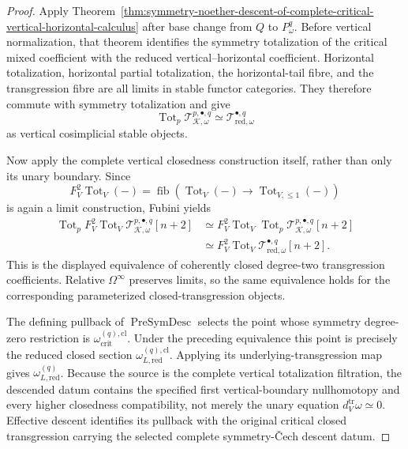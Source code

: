 \begin{proof}
Apply
Theorem~\ref{thm:symmetry-noether-descent-of-complete-critical-vertical-horizontal-calculus}
after base change from $Q$ to $P_\omega^q$.  Before vertical normalization, that
theorem identifies the symmetry totalization of the critical mixed coefficient with
the reduced vertical--horizontal coefficient.  Horizontal totalization, horizontal
partial totalization, the horizontal-tail fibre, and the transgression fibre are
all limits in stable functor categories.  They therefore commute with symmetry
totalization and give
\[
\operatorname{Tot}_p
\mathscr T_{\mathcal K,\omega}^{p,\bullet,q}
\simeq
\mathscr T_{\mathrm{red},\omega}^{\bullet,q}
\]
as vertical cosimplicial stable objects.

Now apply the complete vertical closedness construction itself, rather than only
its unary boundary.  Since
\[
F_V^2\operatorname{Tot}_V(-)
=
\operatorname{fib}
\left(
\operatorname{Tot}_V(-)
\longrightarrow
\operatorname{Tot}_{V,\le1}(-)
\right)
\]
is again a limit construction, Fubini yields
\[
\begin{aligned}
\operatorname{Tot}_p
F_V^2\operatorname{Tot}_V
\mathscr T_{\mathcal K,\omega}^{p,\bullet,q}[n+2]
&\simeq
F_V^2\operatorname{Tot}_V
\operatorname{Tot}_p
\mathscr T_{\mathcal K,\omega}^{p,\bullet,q}[n+2]\\
&\simeq
F_V^2\operatorname{Tot}_V
\mathscr T_{\mathrm{red},\omega}^{\bullet,q}[n+2].
\end{aligned}
\]
This is the displayed equivalence of coherently closed degree-two transgression
coefficients.  Relative $\Omega^\infty$ preserves limits, so the same equivalence
holds for the corresponding parameterized closed-transgression objects.

The defining pullback of $\operatorname{PreSymDesc}$ selects the point whose
symmetry degree-zero restriction is
$\omega_{\mathrm{crit}}^{(q),\mathrm{cl}}$.  Under the preceding equivalence this
point is precisely the reduced closed section
$\omega_{L,\mathrm{red}}^{(q),\mathrm{cl}}$.  Applying its
underlying-transgression map gives $\omega_{L,\mathrm{red}}^{(q)}$.  Because the
source is the complete vertical totalization filtration, the descended datum
contains the specified first vertical-boundary nullhomotopy and every higher
closedness compatibility, not merely the unary equation
$d_V^{\mathrm{tr}}\omega\simeq0$.  Effective descent identifies its pullback with
the original critical closed transgression carrying the selected complete
symmetry-\v{C}ech descent datum.
\end{proof}

